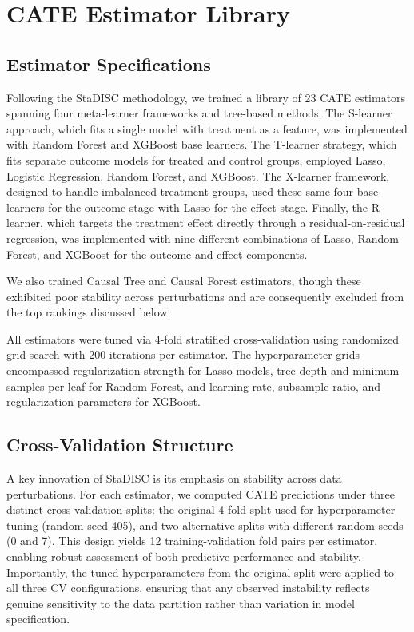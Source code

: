 \documentclass[11pt,a4paper]{article}
\begin{document}
\section{CATE Estimator Library}

\subsection{Estimator Specifications}
Following the StaDISC methodology, we trained a library of 23 CATE estimators spanning four meta-learner frameworks and tree-based methods. The S-learner approach, which fits a single model with treatment as a feature, was implemented with Random Forest and XGBoost base learners. The T-learner strategy, which fits separate outcome models for treated and control groups, employed Lasso, Logistic Regression, Random Forest, and XGBoost. The X-learner framework, designed to handle imbalanced treatment groups, used these same four base learners for the outcome stage with Lasso for the effect stage. Finally, the R-learner, which targets the treatment effect directly through a residual-on-residual regression, was implemented with nine different combinations of Lasso, Random Forest, and XGBoost for the outcome and effect components.

We also trained Causal Tree and Causal Forest estimators, though these exhibited poor stability across perturbations and are consequently excluded from the top rankings discussed below.

All estimators were tuned via 4-fold stratified cross-validation using randomized grid search with 200 iterations per estimator. The hyperparameter grids encompassed regularization strength for Lasso models, tree depth and minimum samples per leaf for Random Forest, and learning rate, subsample ratio, and regularization parameters for XGBoost.

\subsection{Cross-Validation Structure}
A key innovation of StaDISC is its emphasis on stability across data perturbations. For each estimator, we computed CATE predictions under three distinct cross-validation splits: the original 4-fold split used for hyperparameter tuning (random seed 405), and two alternative splits with different random seeds (0 and 7). This design yields 12 training-validation fold pairs per estimator, enabling robust assessment of both predictive performance and stability. Importantly, the tuned hyperparameters from the original split were applied to all three CV configurations, ensuring that any observed instability reflects genuine sensitivity to the data partition rather than variation in model specification.
\end{document}
